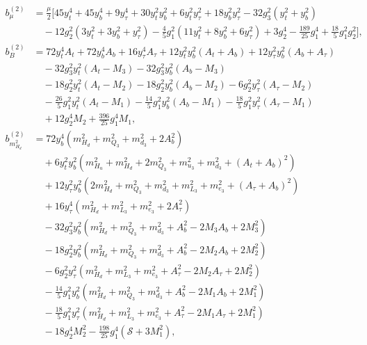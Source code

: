 \documentclass[preprint,amsmath,amssymb,aps,superscriptaddress,prd,showpacs,floatfix,nofootinbib]{revtex4-1}
\begin{document}
\begin{subequations}\label{eq:MSSMTreeLevelCoeffs}
\begin{align}
b_\mu^{(2)}&=\frac{\mu}{2}\Bigg [ 45y_t^4+45y_b^4+9y_\tau^4+30y_t^2y_b^2+6y_t^2y_\tau^2+18y_b^2y_\tau^2-32g_3^2(y_t^2+y_b^2)\nonumber\\
&\quad{}-12g_2^2(3y_t^2+3y_b^2+y_\tau^2)-\frac{4}{5}g_1^2(11y_t^2+8y_b^2+6y_\tau^2)+3g_2^4-\frac{189}{25}g_1^4+\frac{18}{5}g_1^2g_2^2\Bigg ],\label{eq:MSSMmub2}\\
b_B^{(2)}&=72y_t^4A_t+72y_b^4A_b+16y_\tau^4A_\tau+12y_t^2y_b^2(A_t+A_b)+12y_\tau^2y_b^2(A_b+A_\tau)\nonumber\\
&\quad{}-32g_3^2y_t^2(A_t-M_3)-32g_3^2y_b^2(A_b-M_3)\nonumber\\
&\quad{}-18g_2^2y_t^2(A_t-M_2)-18g_2^2y_b^2(A_b-M_2)-6g_2^2y_\tau^2(A_\tau-M_2)\nonumber\\
&\quad{}-\frac{26}{5}g_1^2y_t^2(A_t-M_1)-\frac{14}{5}g_1^2y_b^2(A_b-M_1)-\frac{18}{5}g_1^2y_\tau^2(A_\tau-M_1)\nonumber\\
&\quad{}+12g_2^4M_2+\frac{396}{25}g_1^4M_1,\label{eq:MSSMBb2}\\
b_{m_{H_d}^2}^{(2)}&=72y_b^4\left ( m_{H_d}^2+m_{Q_3}^2+m_{d_3}^2+2A_b^2\right )\nonumber\\
&\quad{}+6y_t^2y_b^2\left ( m_{H_u}^2+m_{H_d}^2+2m_{Q_3}^2+m_{u_3}^2+m_{d_3}^2+(A_t+A_b)^2\right )\nonumber\\
&\quad{}+12y_\tau^2y_b^2\left ( 2m_{H_d}^2+m_{Q_3}^2+m_{d_3}^2+m_{L_3}^2+m_{e_3}^2+(A_\tau+A_b)^2\right )\nonumber\\
&\quad{}+16y_\tau^4\left ( m_{H_d}^2+m_{L_3}^2+m_{e_3}^2+2A_\tau^2\right )\nonumber\\
&\quad{}-32g_3^2y_b^2\left ( m_{H_d}^2+m_{Q_3}^2+m_{d_3}^2+A_b^2-2M_3A_b+2M_3^2\right )\nonumber\\
&\quad{}-18g_2^2y_b^2\left ( m_{H_d}^2+m_{Q_3}^2+m_{d_3}^2+A_b^2-2M_2A_b+2M_2^2\right )\nonumber\\
&\quad{}-6g_2^2y_\tau^2\left ( m_{H_d}^2+m_{L_3}^2+m_{e_3}^2+A_\tau^2-2M_2A_\tau+2M_2^2\right )\nonumber\\
&\quad{}-\frac{14}{5}g_1^2y_b^2\left ( m_{H_d}^2+m_{Q_3}^2+m_{d_3}^2+A_b^2-2M_1A_b+2M_1^2\right )\nonumber\\
&\quad{}-\frac{18}{5}g_1^2y_\tau^2\left ( m_{H_d}^2+m_{L_3}^2+m_{e_3}^2+A_\tau^2-2M_1A_\tau+2M_1^2\right )\nonumber\\
&\quad{}-18g_2^4M_2^2-\frac{198}{25}g_1^4\left ( \mathcal{S}+3M_1^2\right ),\label{eq:MSSMmHd2b2}\\

\end{align}
\end{subequations}
\end{document}

